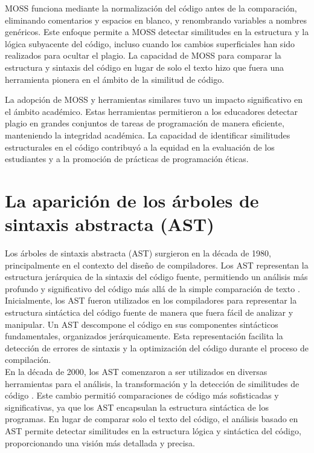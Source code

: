 MOSS funciona mediante la normalización del código antes de la comparación, eliminando comentarios y espacios en blanco, y renombrando variables a nombres genéricos. Este enfoque permite a MOSS detectar similitudes en la estructura y la lógica subyacente del código, incluso cuando los cambios superficiales han sido realizados para ocultar el plagio. La capacidad de MOSS para comparar la estructura y sintaxis del código en lugar de solo el texto hizo que fuera una herramienta pionera en el ámbito de la similitud de código.

La adopción de MOSS y herramientas similares tuvo un impacto significativo en el ámbito académico. Estas herramientas permitieron a los educadores detectar plagio en grandes conjuntos de tareas de programación de manera eficiente, manteniendo la integridad académica. La capacidad de identificar similitudes estructurales en el código contribuyó a la equidad en la evaluación de los estudiantes y a la promoción de prácticas de programación éticas.

\section*{\textbf{La aparición de los árboles de sintaxis abstracta (AST)}}
Los árboles de sintaxis abstracta (AST) surgieron en la década de 1980, principalmente en el contexto del diseño de compiladores. Los AST representan la estructura jerárquica de la sintaxis del código fuente, permitiendo un análisis más profundo y significativo del código más allá de la simple comparación de texto \cite{aho1986compilers}. \\

Inicialmente, los AST fueron utilizados en los compiladores para representar la estructura sintáctica del código fuente de manera que fuera fácil de analizar y manipular. Un AST descompone el código en sus componentes sintácticos fundamentales, organizados jerárquicamente. Esta representación facilita la detección de errores de sintaxis y la optimización del código durante el proceso de compilación. \\

En la década de 2000, los AST comenzaron a ser utilizados en diversas herramientas para el análisis, la transformación y la detección de similitudes de código \cite{muchnick1997advanced}. Este cambio permitió comparaciones de código más sofisticadas y significativas, ya que los AST encapsulan la estructura sintáctica de los programas. En lugar de comparar solo el texto del código, el análisis basado en AST permite detectar similitudes en la estructura lógica y sintáctica del código, proporcionando una visión más detallada y precisa. \\

